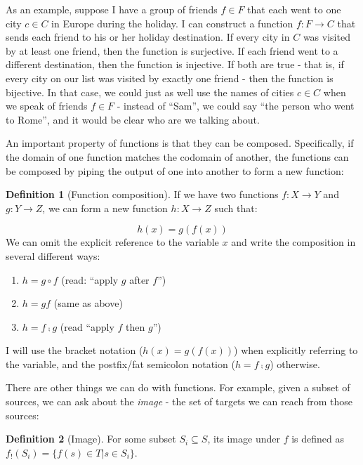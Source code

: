 \documentclass[
]{book}
\providecommand{\tightlist}{%
  \setlength{\itemsep}{0pt}\setlength{\parskip}{0pt}}
\theoremstyle{definition}
\newtheorem{definition}{Definition}[chapter]
\theoremstyle{definition}
\theoremstyle{definition}
\theoremstyle{definition}
\theoremstyle{remark}
\begin{document}
As an example, suppose I have a group of friends \(f \in F\) that each went to one city \(c \in C\) in Europe during the holiday. I can construct a function \(f: F \to C\) that sends each friend to his or her holiday destination. If every city in \(C\) was visited by at least one friend, then the function is surjective. If each friend went to a different destination, then the function is injective. If both are true - that is, if every city on our list was visited by exactly one friend - then the function is bijective. In that case, we could just as well use the names of cities \(c \in C\) when we speak of friends \(f \in F\) - instead of ``Sam'', we could say ``the person who went to Rome'', and it would be clear who are we talking about.

An important property of functions is that they can be composed. Specifically, if the domain of one function matches the codomain of another, the functions can be composed by piping the output of one into another to form a new function:

\begin{definition}[Function composition]

If we have two functions \(f: X \to Y\) and \(g: Y \to Z\), we can form a new function \(h: X \to Z\) such that:

\[h(x) = g(f(x))\]
We can omit the explicit reference to the variable \(x\) and write the composition in several different ways:

\begin{enumerate}
\def\labelenumi{\arabic{enumi}.}
\tightlist
\item
  \(h = g \circ f\) (read: ``apply \(g\) after \(f\)'')
\item
  \(h = gf\) (same as above)
\item
  \(h = f ⨾ g\) (read ``apply \(f\) then \(g\)'')
\end{enumerate}

\end{definition}

I will use the bracket notation (\(h(x) = g(f(x))\)) when explicitly referring to the variable, and the postfix/fat semicolon notation (\(h = f ⨾ g\)) otherwise.

There are other things we can do with functions. For example, given a subset of sources, we can ask about the \emph{image} - the set of targets we can reach from those sources:

\begin{definition}[Image]
For some subset \(S_i \subseteq S\), its image under \(f\) is defined as \(f_!(S_i) = \{ f(s) \in T \lvert s \in S_i \}\).
\end{definition}
\end{document}
